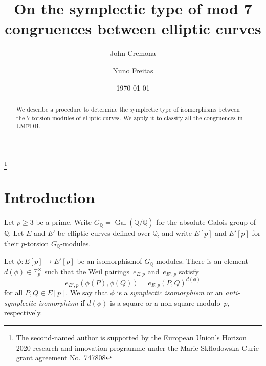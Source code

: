 \documentclass[12pt]{amsart}
\newcommand{\F}{\mathbb{F}}
\newcommand{\Q}{\mathbb{Q}}
\newcommand{\Qbar}{{\overline{\Q}}}
\DeclareMathOperator{\Gal}{Gal}
\numberwithin{equation}{section}
\theoremstyle{definition}
\theoremstyle{remark}
\begin{document}
\title{On the symplectic type of mod 7 congruences between elliptic curves}

\author{John Cremona}
\address{Mathematics Institute,
         University of Warwick,
         Coventry CV4 7AL,
         United Kingdom}


\author{Nuno Freitas}
\address{Mathematics Institute,
         University of Warwick,
         Coventry CV4 7AL,
         United Kingdom}


\date{\today}


\thanks{The second-named author is
supported by the
European Union's Horizon 2020 research and innovation programme under the Marie Sk\l{l}odowska-Curie grant 
agreement No.\ 747808}


\maketitle

\begin{abstract} 
We describe a procedure to determine the symplectic type of isomorphisms between the $7$-torsion modules of elliptic curves.
We apply it to classify all the congruences in LMFDB.
\end{abstract}

\section{Introduction}

Let $p \geq 3$ be a prime. Write $G_\Q = \Gal(\Qbar/\Q)$ for 
the absolute Galois group of $\Q$. 
Let $E$ and $E'$ be elliptic curves defined over $\Q$, and write 
$E[p]$ and $E'[p]$ for their $p$-torsion $G_\Q$-modules. 

Let $\phi : E[p] \to E'[p]$ be an isomorphismof $G_\Q$-modules.
There is an element $d(\phi) \in \F_p^\times$ such that
the Weil pairings~$e_{E,p}$ and~$e_{E',p}$ satisfy
\[
e_{E',p}(\phi(P), \phi(Q)) = e_{E,p}(P, Q)^{d(\phi)}
\]
for all $P, Q \in E[p]$.
We say that $\phi$ is a {\it symplectic isomorphism} or an
{\it anti-symplectic isomorphism}
if $d(\phi)$ is a square or a non-square modulo~$p$, 
respectively.
\end{document}
